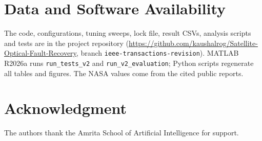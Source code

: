 \documentclass[journal]{IEEEtran}
\begin{document}
\section*{Data and Software Availability}
The code, configurations, tuning sweeps, lock file, result CSVs, analysis scripts and tests are in the project repository (\url{https://github.com/kaushalrog/Satellite-Optical-Fault-Recovery}, branch \texttt{ieee-transactions-revision}). MATLAB R2026a runs \texttt{run\_tests\_v2} and \texttt{run\_v2\_evaluation}; Python scripts regenerate all tables and figures. The NASA values come from the cited public reports.

\section*{Acknowledgment}
The authors thank the Amrita School of Artificial Intelligence for support.
\end{document}
